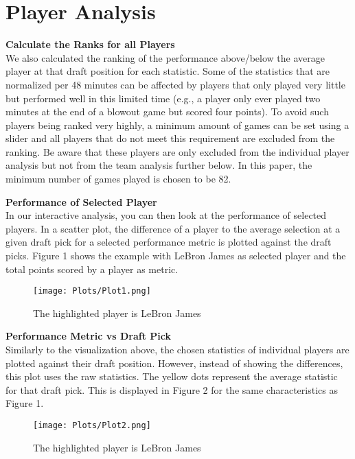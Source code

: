 \documentclass[12pt]{article}
\begin{document}
\section{Player Analysis}
\textbf{Calculate the Ranks for all Players } \\
We also calculated the ranking of the performance above/below the average player at that draft position for each statistic. Some of the statistics that are normalized per 48 minutes can be affected by players that only played very little but performed well in this limited time (e.g., a player only ever played two minutes at the end of a blowout game but scored four points). To avoid such players being ranked very highly, a minimum amount of games can be set using a slider and all players that do not meet this requirement are excluded from the ranking. Be aware that these players are only excluded from the individual player analysis but not from the team analysis further below. In this paper, the minimum number of games played is chosen to be 82. \\
\vspace{5mm}

\textbf{Performance of Selected Player} \\
In our interactive analysis, you can then look at the performance of selected players. In a scatter plot, the difference of a player to the average selection at a given draft pick for a selected performance metric is plotted against the draft picks. Figure 1 shows the example with LeBron James as selected player and the total points scored by a player as metric.

\begin{figure}[H]
    \centering
    \texttt{[image: Plots/Plot1.png]}

    \caption{The highlighted player is LeBron James}
    \label{fig:1}
\end{figure}


\textbf{Performance Metric vs Draft Pick} \\
Similarly to the visualization above, the chosen statistics of individual players are plotted against their draft position. However, instead of showing the differences, this plot uses the raw statistics. The yellow dots represent the average statistic for that draft pick. This is displayed in Figure 2 for the same characteristics as Figure 1.

\begin{figure}[H]
    \centering
    \texttt{[image: Plots/Plot2.png]}

    \caption{The highlighted player is LeBron James}
    \label{fig:2}
\end{figure}
\end{document}
